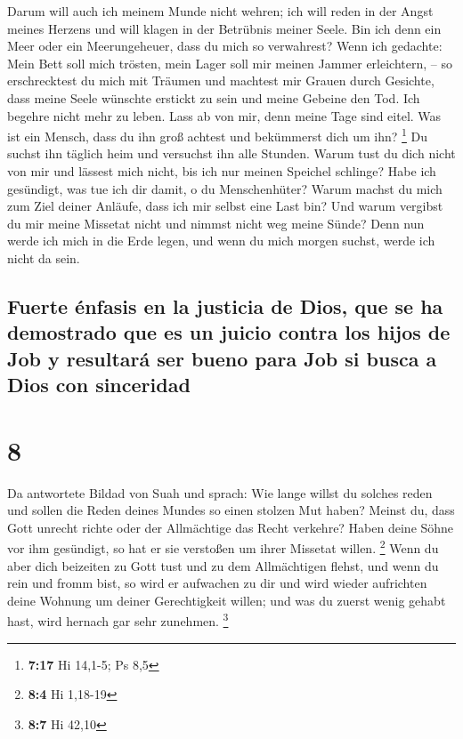  Darum will auch ich meinem Munde nicht wehren; ich will
reden in der Angst meines Herzens und will klagen in der Betrübnis
meiner Seele.  Bin ich denn ein Meer oder ein
Meerungeheuer, dass du mich so verwahrest?  Wenn ich
gedachte: Mein Bett soll mich trösten, mein Lager soll mir meinen Jammer
erleichtern, --  so erschrecktest du mich mit Träumen und
machtest mir Grauen durch Gesichte,  dass meine Seele
wünschte erstickt zu sein und meine Gebeine den Tod.  Ich
begehre nicht mehr zu leben. Lass ab von mir, denn meine Tage sind
eitel.  Was ist ein Mensch, dass du ihn groß achtest und
bekümmerst dich um ihn? \footnote{\textbf{7:17} Hi 14,1-5; Ps 8,5}
 Du suchst ihn täglich heim und versuchst ihn alle
Stunden.  Warum tust du dich nicht von mir und lässest
mich nicht, bis ich nur meinen Speichel schlinge?  Habe
ich gesündigt, was tue ich dir damit, o du Menschenhüter? Warum machst
du mich zum Ziel deiner Anläufe, dass ich mir selbst eine Last bin?
 Und warum vergibst du mir meine Missetat nicht und
nimmst nicht weg meine Sünde? Denn nun werde ich mich in die Erde legen,
und wenn du mich morgen suchst, werde ich nicht da sein.

\hypertarget{fuerte-uxe9nfasis-en-la-justicia-de-dios-que-se-ha-demostrado-que-es-un-juicio-contra-los-hijos-de-job-y-resultaruxe1-ser-bueno-para-job-si-busca-a-dios-con-sinceridad}{%
\subsection{Fuerte énfasis en la justicia de Dios, que se ha demostrado
que es un juicio contra los hijos de Job y resultará ser bueno para Job
si busca a Dios con
sinceridad}\label{fuerte-uxe9nfasis-en-la-justicia-de-dios-que-se-ha-demostrado-que-es-un-juicio-contra-los-hijos-de-job-y-resultaruxe1-ser-bueno-para-job-si-busca-a-dios-con-sinceridad}}

\hypertarget{section-7}{%
\section{8}\label{section-7}}

 Da antwortete Bildad von Suah und sprach: 
Wie lange willst du solches reden und sollen die Reden deines Mundes so
einen stolzen Mut haben?  Meinst du, dass Gott unrecht
richte oder der Allmächtige das Recht verkehre?  Haben
deine Söhne vor ihm gesündigt, so hat er sie verstoßen um ihrer Missetat
willen. \footnote{\textbf{8:4} Hi 1,18-19}  Wenn du aber
dich beizeiten zu Gott tust und zu dem Allmächtigen flehst,
 und wenn du rein und fromm bist, so wird er aufwachen zu
dir und wird wieder aufrichten deine Wohnung um deiner Gerechtigkeit
willen;  und was du zuerst wenig gehabt hast, wird hernach
gar sehr zunehmen. \footnote{\textbf{8:7} Hi 42,10}

